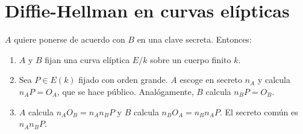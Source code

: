 \documentclass[CR.tex]{subfiles}
\begin{document}
\section{Diffie-Hellman en curvas elípticas}
$A$ quiere ponerse de acuerdo con $B$ en una clave secreta. Entonces:
\begin{enumerate}
\item $A$ y $B$ fijan una curva elíptica $E/k$ sobre un cuerpo finito $k$. 
\item Sea $P\in E(k)$ fijado con orden grande. $A$ escoge en secreto $n_A$ y calcula $n_AP=O_A$, que se hace público. Analógamente, $B$ calcula $n_BP=O_B$. 
\item $A$ calcula $n_AO_B=n_An_BP$ y $B$ calcula $n_BO_A=n_Bn_AP$. El secreto común es $n_An_BP$. 
\end{enumerate}
\end{document}
